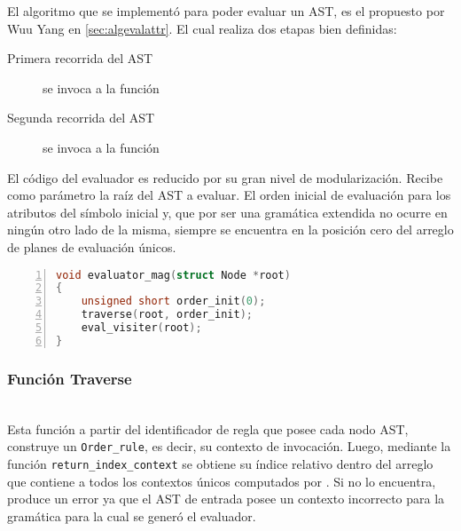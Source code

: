 El algoritmo que se implementó para poder evaluar un AST, es el propuesto por Wuu Yang en \ref{sec:algevalattr}. El cual realiza dos etapas bien definidas:

\begin{description}
\item [Primera recorrida del AST] se invoca a la función

\item [Segunda recorrida del AST] se invoca a la función
\end{description}

El código del evaluador es reducido por su gran nivel de modularización. Recibe como parámetro la raíz del AST a evaluar. El orden inicial de evaluación para los atributos del símbolo inicial y, que por ser una gramática extendida no ocurre en ningún otro lado de la misma, siempre se encuentra en la posición cero del arreglo de planes de evaluación únicos.

\vspace*{0.2cm}
\begin{lstlisting}[language=C++, basicstyle=\scriptsize, numbers=left, columns=fullflexible, linewidth=6cm]
void evaluator_mag(struct Node *root)
{
    unsigned short order_init(0);
    traverse(root, order_init);
    eval_visiter(root);
}
\end{lstlisting}
\vspace*{0.2cm}
\subsubsection{Función Traverse}
\\

Esta función a partir del identificador de regla que posee cada nodo AST, construye un \texttt{Order\_rule}, es decir, su contexto de invocación. Luego, mediante la función \texttt{return\_index\_context} se obtiene su índice relativo dentro del arreglo que contiene a todos los contextos únicos computados por \maggen. Si no lo encuentra, produce un error ya que el AST de entrada posee un contexto incorrecto para la gramática para la cual se generó el evaluador.

